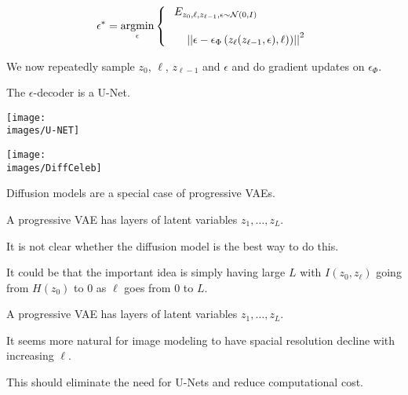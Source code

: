 {\vfill
$$\epsilon^* = \operatorname*{argmin}_{\epsilon}
\left\{\begin{array}{l}\;E_{z_0,\ell,z_{\ell-1},\epsilon \sim {\cal N}(0,I)}\; \\
\\
~\;\;\;\;\left|\left|\epsilon - \epsilon_\Phi\left(z_\ell(z_{\ell-1},\epsilon),\ell)\right)\right|\right|^2
\end{array}\right.$$

\vfill
We now repeatedly sample $z_0$, $\ell$, $z_{\ell-1}$ and $\epsilon$ and do gradient updates on $\epsilon_\Phi$.


The $\epsilon$-decoder is a U-Net.

\centerline{\texttt{[image: \\images/U-NET]}}


\centerline{\texttt{[image: \\images/DiffCeleb]}}


Diffusion models are a special case of progressive VAEs.

\vfill
A progressive VAE has layers of latent variables $z_1,\dots,z_{L}$.

\vfill
It is not clear whether the diffusion model is the best way to do this.

\vfill
It could be that the important idea is simply having large $L$ with
$I(z_0,z_\ell)$ going from $H(z_0)$ to 0 as $\ell$ goes from $0$ to $L$.



A progressive VAE has layers of latent variables $z_1,\dots,z_{L}$.

\vfill
It seems more natural for image modeling to have spacial resolution decline with increasing $\ell$.

\vfill
This should eliminate the need for U-Nets and reduce computational cost.

}

